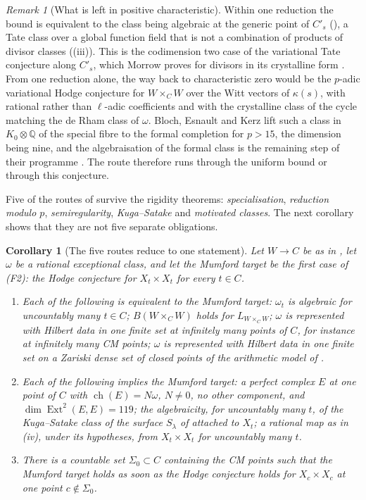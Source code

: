 \documentclass[11pt,reqno]{amsart}
\theoremstyle{plain}
\newtheorem{corollary}[theorem]{Corollary}
\theoremstyle{definition}
\theoremstyle{remark}
\newtheorem{remark}[theorem]{Remark}
\newcommand{\QQ}{\mathbb{Q}}
\DeclareMathOperator{\ch}{ch}
\DeclareMathOperator{\Ext}{Ext}
\begin{document}
\begin{remark}[What is left in positive characteristic]
Within one reduction the bound is equivalent to the class being algebraic at
the generic point of $C'_{s}$ (), a Tate class over a
global function field that is not a combination of products of divisor
classes ((iii)). This is the codimension two case of the
variational Tate conjecture along $C'_{s}$, which Morrow proves for divisors
in its crystalline form \cite{Mor19}. From one reduction alone, the way back
to characteristic zero would be the $p$-adic variational Hodge conjecture for
$W\times_{C}W$ over the Witt vectors of $\kappa(s)$, with rational rather than
$\ell$-adic coefficients and with the crystalline class of the cycle matching
the de Rham class of $\omega$. Bloch, Esnault and Kerz lift such a class in
$K_{0}\otimes\QQ$ of the special fibre to the formal completion for $p>15$,
the dimension being nine, and the algebraisation of the formal class is the
remaining step of their programme \cite[Theorem~1.3]{BEK14}. The route
therefore runs through the uniform bound or through this conjecture.
\end{remark}

Five of the routes of  survive the rigidity theorems:
\emph{specialisation}, \emph{reduction modulo $p$}, \emph{semiregularity},
\emph{Kuga--Satake} and \emph{motivated classes}. The next corollary shows
that they are not five separate obligations.

\begin{corollary}[The five routes reduce to one statement]\label{cor:mumfordone}
Let $W\to C$ be as in , let $\omega$ be a rational
exceptional class, and let the \emph{Mumford target} be the first case of
\textup{(F2)}: the Hodge conjecture for $X_{t}\times X_{t}$ for every $t\in C$.
\begin{enumerate}[label=\textup{(\roman*)},leftmargin=2.6em,itemsep=2pt]
\item Each of the following is equivalent to the Mumford target: $\omega_{t}$ is
  algebraic for uncountably many $t\in C$; $B(W\times_{C}W)$ holds for
  $L_{W\times_{C}W}$; $\omega$ is represented with Hilbert data in one finite
  set at infinitely many points of $C$, for instance at infinitely many CM
  points; $\omega$ is represented with Hilbert data in one finite set on a
  Zariski dense set of closed points of the arithmetic model of
  .
\item Each of the following implies the Mumford target: a perfect complex $E$
  at one point of $C$ with $\ch(E)=N\omega$, $N\ne0$, no other component, and
  $\dim\Ext^{2}(E,E)=119$; the algebraicity, for uncountably many $t$, of the
  Kuga--Satake class of the surface $S_{\lambda}$ of 
  attached to $X_{t}$; a rational map as in (iv), under
  its hypotheses, from $X_{t}\times X_{t}$ for uncountably many $t$.
\item There is a countable set $\Sigma_{0}\subset C$ containing the CM points
  such that the Mumford target holds as soon as the Hodge conjecture holds for
  $X_{c}\times X_{c}$ at one point $c\notin\Sigma_{0}$.
\end{enumerate}
\end{corollary}
\end{document}
